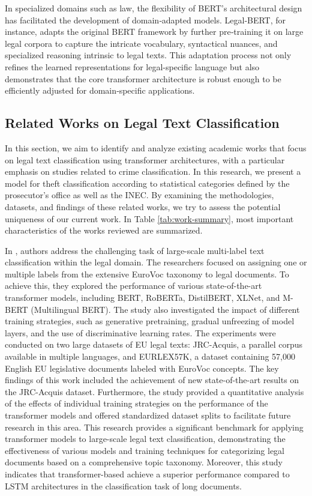 \documentclass[onecolumn, journal, english, 12pt, a4paper]{IEEEtran} %
\theoremstyle{definition}
\begin{document}
In specialized domains such as law, the flexibility of BERT’s
architectural design has facilitated the development of domain‑adapted
models. Legal‑BERT, for instance, adapts the original BERT framework
by further pre‑training it on large legal corpora to capture the
intricate vocabulary, syntactical nuances, and specialized reasoning
intrinsic to legal texts\cite{chalkidis2020legal}. This adaptation
process not only refines the learned representations for
legal-specific language but also demonstrates that the core
transformer architecture is robust enough to be efficiently adjusted
for domain‑specific applications.

\subsection{Related Works on Legal Text Classification}
\label{sec:relat-works-mach}
In this section, we aim to identify and analyze existing academic
works that focus on legal text classification using transformer
architectures, with a particular emphasis on studies related to crime
classification. In this research, we present a model for theft
classification according to statistical categories defined by the
prosecutor's office as well as the INEC. By examining the
methodologies, datasets, and findings of these related works, we try
to assess the potential uniqueness of our current work. In Table
\ref{tab:work-summary}, most important characteristics of the works
reviewed are summarized.

In \cite{Shaheen2020}, authors address the challenging task of
large-scale multi-label text classification within the legal
domain. The researchers focused on assigning one or multiple labels
from the extensive EuroVoc taxonomy to legal documents. To achieve
this, they explored the performance of various state-of-the-art
transformer models, including BERT, RoBERTa, DistilBERT, XLNet, and
M-BERT (Multilingual BERT). The study also investigated the impact of
different training strategies, such as generative pretraining, gradual
unfreezing of model layers, and the use of discriminative learning
rates. The experiments were conducted on two large datasets of EU
legal texts: JRC-Acquis, a parallel corpus available in multiple
languages, and EURLEX57K, a dataset containing 57,000 English EU
legislative documents labeled with EuroVoc concepts. The key findings
of this work included the achievement of new state-of-the-art results
on the JRC-Acquis dataset. Furthermore, the study provided a
quantitative analysis of the effects of individual training strategies
on the performance of the transformer models and offered standardized
dataset splits to facilitate future research in this area. This
research provides a significant benchmark for applying transformer
models to large-scale legal text classification, demonstrating the
effectiveness of various models and training techniques for
categorizing legal documents based on a comprehensive topic
taxonomy. Moreover, this study indicates that transformer-based
achieve a superior performance compared to LSTM architectures in the
classification task of long documents. 
\end{document}
